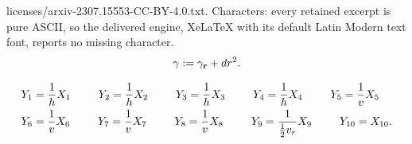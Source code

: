 \documentclass[10pt,a4paper]{amsart}
\def\g{\gamma}
\begin{document}
licenses/arxiv-2307.15553-CC-BY-4.0.txt. Characters: every retained excerpt is pure ASCII, so the delivered engine, XeLaTeX with its default Latin Modern text font, reports no missing character.
	\begin{equation}\label{eqn:/g}
	{\bf \g} := {\bf \g_r} + dr^2.
	\end{equation}

	\begin{align}
	&Y_1 = \frac{1}{h} X_1	\hskip 25pt	Y_2 = \frac{1}{h} X_2	\hskip 25pt	Y_3 = \frac{1}{h} X_3		\hskip 25pt	Y_4 = \frac{1}{h} X_4  \hskip 25pt  Y_5 = \frac{1}{v} X_5  \label{eqn:orthonormal basis 2}	  \\
	&Y_6 = \frac{1}{v} X_6		\hskip 25pt	Y_7 = \frac{1}{v} X_7		\hskip 25pt	Y_8 = \frac{1}{v} X_8	\hskip 25pt	Y_9 = \frac{1}{\frac{1}{2} v_r} X_9  \hskip 25pt  Y_{10} = X_{10}.  \nonumber
	\end{align}
\end{document}
